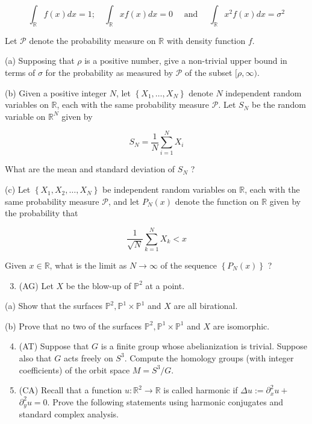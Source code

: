 \documentclass[10pt]{article}
\begin{document}
$$
\int_{\mathbb{R}} f(x) d x=1 ; \quad \int_{\mathbb{R}} x f(x) d x=0 \quad \text { and } \quad \int_{\mathbb{R}} x^{2} f(x) d x=\sigma^{2}
$$

Let $\mathcal{P}$ denote the probability measure on $\mathbb{R}$ with density function $f$.

(a) Supposing that $\rho$ is a positive number, give a non-trivial upper bound in terms of $\sigma$ for the probability as measured by $\mathcal{P}$ of the subset $[\rho, \infty)$.

(b) Given a positive integer $N$, let $\left\{X_{1}, \ldots, X_{N}\right\}$ denote $N$ independent random variables on $\mathbb{R}$, each with the same probability measure $\mathcal{P}$. Let $S_{N}$ be the random variable on $\mathbb{R}^{N}$ given by

$$
S_{N}=\frac{1}{N} \sum_{i=1}^{N} X_{i}
$$

What are the mean and standard deviation of $S_{N}$ ?

(c) Let $\left\{X_{1}, X_{2}, \ldots, X_{N}\right\}$ be independent random variables on $\mathbb{R}$, each with the same probability measure $\mathcal{P}$, and let $P_{N}(x)$ denote the function on $\mathbb{R}$ given by the probability that

$$
\frac{1}{\sqrt{N}} \sum_{k=1}^{N} X_{k}<x
$$

Given $x \in \mathbb{R}$, what is the limit as $N \rightarrow \infty$ of the sequence $\left\{P_{N}(x)\right\}$ ?

\begin{enumerate}
  \setcounter{enumi}{2}
  \item (AG) Let $X$ be the blow-up of $\mathbb{P}^{2}$ at a point.
\end{enumerate}

(a) Show that the surfaces $\mathbb{P}^{2}, \mathbb{P}^{1} \times \mathbb{P}^{1}$ and $X$ are all birational.

(b) Prove that no two of the surfaces $\mathbb{P}^{2}, \mathbb{P}^{1} \times \mathbb{P}^{1}$ and $X$ are isomorphic.

\begin{enumerate}
  \setcounter{enumi}{3}
  \item (AT) Suppose that $G$ is a finite group whose abelianization is trivial. Suppose also that $G$ acts freely on $S^{3}$. Compute the homology groups (with integer coefficients) of the orbit space $M=S^{3} / G$.

  \item (CA) Recall that a function $u: \mathbb{R}^{2} \rightarrow \mathbb{R}$ is called harmonic if $\Delta u:=\partial_{x}^{2} u+$ $\partial_{y}^{2} u=0$. Prove the following statements using harmonic conjugates and standard complex analysis.

\end{enumerate}
\end{document}
